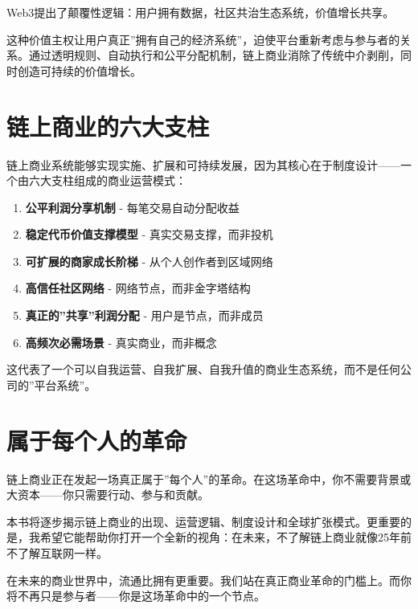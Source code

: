\documentclass[
  Letterpaper,
]{scrbook}
\providecommand{\tightlist}{%
  \setlength{\itemsep}{0pt}\setlength{\parskip}{0pt}}
\begin{document}
Web3提出了颠覆性逻辑：用户拥有数据，社区共治生态系统，价值增长共享。

这种价值主权让用户真正''拥有自己的经济系统''，迫使平台重新考虑与参与者的关系。通过透明规则、自动执行和公平分配机制，链上商业消除了传统中介剥削，同时创造可持续的价值增长。

\section*{链上商业的六大支柱}\label{ux94feux4e0aux5546ux4e1aux7684ux516dux5927ux652fux67f1}


链上商业系统能够实现实施、扩展和可持续发展，因为其核心在于制度设计------一个由六大支柱组成的商业运营模式：

\begin{enumerate}
\def\labelenumi{\arabic{enumi}.}
\tightlist
\item
  \textbf{公平利润分享机制} - 每笔交易自动分配收益
\item
  \textbf{稳定代币价值支撑模型} - 真实交易支撑，而非投机
\item
  \textbf{可扩展的商家成长阶梯} - 从个人创作者到区域网络
\item
  \textbf{高信任社区网络} - 网络节点，而非金字塔结构
\item
  \textbf{真正的''共享''利润分配} - 用户是节点，而非成员
\item
  \textbf{高频次必需场景} - 真实商业，而非概念
\end{enumerate}

这代表了一个可以自我运营、自我扩展、自我升值的商业生态系统，而不是任何公司的''平台系统''。

\section*{属于每个人的革命}\label{ux5c5eux4e8eux6bcfux4e2aux4ebaux7684ux9769ux547d}


链上商业正在发起一场真正属于''每个人''的革命。在这场革命中，你不需要背景或大资本------你只需要行动、参与和贡献。

本书将逐步揭示链上商业的出现、运营逻辑、制度设计和全球扩张模式。更重要的是，我希望它能帮助你打开一个全新的视角：在未来，不了解链上商业就像25年前不了解互联网一样。

在未来的商业世界中，流通比拥有更重要。我们站在真正商业革命的门槛上。而你将不再只是参与者------你是这场革命中的一个节点。
\end{document}
